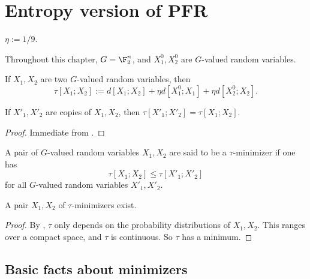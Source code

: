 \chapter{Entropy version of PFR}

\begin{definition}\label{eta-def}
 \leanok
  $\eta := 1/9$.
\end{definition}

Throughout this chapter,  $G = \F_2^n$, and $X^0_1, X^0_2$ are $G$-valued random variables.

\begin{definition}\label{tau-def}
  \leanok
If $X_1,X_2$ are two $G$-valued random variables, then
$$  \tau[X_1; X_2] := d[X_1; X_2] + \eta  d[X^0_1; X_1] + \eta d[X^0_2; X_2].$$
\end{definition}

\begin{lemma}\label{tau-copy}\leanok
    If $X'_1, X'_2$ are copies of $X_1,X_2$, then $\tau[X'_1;X'_2] = \tau[X_1;X_2]$.
\end{lemma}


\begin{proof}\leanok Immediate from .
\end{proof}

\begin{definition}\label{tau-min-def}
\leanok
A pair of $G$-valued random variables $X_1, X_2$ are said to be a $\tau$-minimizer if one has
  $$\tau[X_1;X_2] \leq \tau[X'_1;X'_2]
  $$
for all $G$-valued random variables $X'_1, X'_2$.
\end{definition}


\begin{proposition}\label{tau-min}
  \leanok
A pair $X_1, X_2$ of $\tau$-minimizers exist.
\end{proposition}

\begin{proof}\leanok By , $\tau$ only depends on the probability distributions of $X_1, X_2$. This ranges over a compact space, and $\tau$ is continuous.  So $\tau$ has a minimum.
\end{proof}

\section{Basic facts about minimizers}

